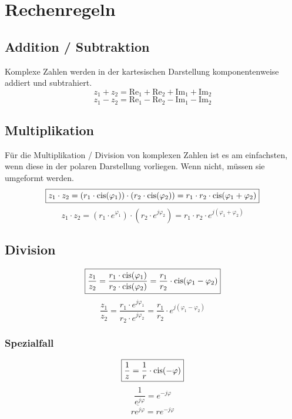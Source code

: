 \section{Rechenregeln}

\subsection{Addition / Subtraktion}
Komplexe Zahlen werden in der kartesischen Darstellung komponentenweise addiert 
und subtrahiert. 
\[ \boxed{z_1 + z_2 = \text{Re}_1 + \text{Re}_2 + \text{Im}_1 + \text{Im}_2} \]
\[ \boxed{z_1 - z_2 = \text{Re}_1 - \text{Re}_2 - \text{Im}_1 - \text{Im}_2} \]

\subsection{Multiplikation}
Für die Multiplikation / Division von komplexen Zahlen ist es am einfachsten, 
wenn diese in der polaren Darstellung vorliegen. Wenn nicht, müssen sie 
umgeformt werden. 
\[ \boxed{z_1 \cdot z_2 
= (r_1 \cdot \operatorname{cis}(\varphi_1)) \cdot (r_2 \cdot \operatorname{cis}(\varphi_2)) 
= r_1 \cdot r_2 \cdot \operatorname{cis}(\varphi_1 + \varphi_2)} \]
\[ \boxed{z_1 \cdot z_2 
= (r_1 \cdot e^{\varphi_1}) \cdot (r_2 \cdot e^{j \varphi_2}) 
= r_1 \cdot r_2 \cdot e^{j (\varphi_1 + \varphi_2)}} \]

\subsection{Division}
\[ \boxed{\frac{z_1}{z_2} 
= \frac{r_1 \cdot \operatorname{cis}(\varphi_1)}{r_2 \cdot \operatorname{cis}(\varphi_2)}
= \frac{r_1}{r_2} \cdot \operatorname{cis}(\varphi_1 - \varphi_2)} \]
\[ \boxed{\frac{z_1}{z_2} 
= \frac{r_1 \cdot e^{j \varphi_1}}{r_2 \cdot e^{j \varphi_2}}
= \frac{r_1}{r_2} \cdot e^{j (\varphi_1 - \varphi_2)}} \]

\subsubsection{Spezialfall}
\[ \boxed{\frac{1}{z} = \frac{1}{r} \cdot \operatorname{cis}(-\varphi)} \]
\[ \boxed{\frac{1}{e^{j \varphi}} = e^{-j\varphi}} \]
\[ \boxed{\overline{r e^{j\varphi}} = r e^{-j\varphi}} \]

